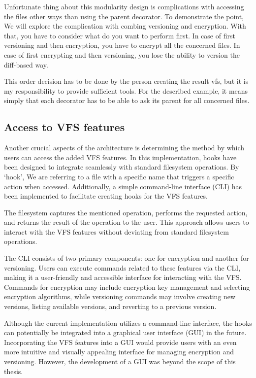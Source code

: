 Unfortunate thing about this modularity design is complications with accessing the files other ways than using the parent decorator.
To demonstrate the point, We will explore the complication with combing versioning and encryption.
With that, you have to consider what do you want to perform first.
In case of first versioning and then encryption, you have to encrypt all the concerned files.
In case of first encrypting and then versioning, you lose the ability to version the diff-based way.

This order decision has to be done by the person creating the result vfs, but it is my responsibility to provide sufficient tools.
For the described example, it means simply that each decorator has to be able to ask its parent for all concerned files.

\subsection{Access to VFS features}\label{subsec:access-to-vfs-features}

Another crucial aspects of the architecture is determining the method by which users can access the added VFS features.
In this implementation, hooks have been designed to integrate seamlessly with standard filesystem operations.
By `hook', We are referring to a file with a specific name that triggers a specific action when accessed.
Additionally, a simple command-line interface (CLI) has been implemented to facilitate creating hooks for the VFS features.

The filesystem captures the mentioned operation, performs the requested action, and returns the result of the operation to the user.
This approach allows users to interact with the VFS features without deviating from standard filesystem operations.

The CLI consists of two primary components: one for encryption and another for versioning.
Users can execute commands related to these features via the CLI, making it a user-friendly and accessible interface for interacting with the VFS\@.
Commands for encryption may include encryption key management and selecting encryption algorithms, while versioning commands may involve creating new versions, listing available versions, and reverting to a previous version.

Although the current implementation utilizes a command-line interface, the hooks can potentially be integrated into a graphical user interface (GUI) in the future.
Incorporating the VFS features into a GUI would provide users with an even more intuitive and visually appealing interface for managing encryption and versioning.
However, the development of a GUI was beyond the scope of this thesis.


